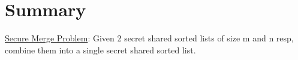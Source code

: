 
\clearpage
{}

%
\setcounter{section}{0} %

\section{Summary}
\underline{Secure Merge Problem}: Given 2 secret shared sorted lists of size m and n resp, combine them into a single secret shared sorted list.\\

